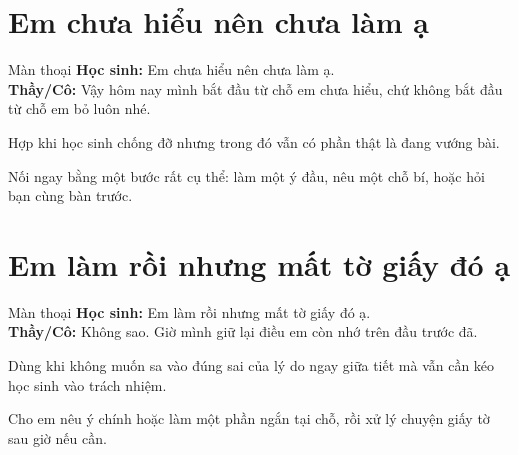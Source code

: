 \section{Em chưa hiểu nên chưa làm ạ}
\begin{manthoai}{Màn thoại}
\textbf{Học sinh:} Em chưa hiểu nên chưa làm ạ.\\
\textbf{Thầy/Cô:} Vậy hôm nay mình bắt đầu từ chỗ em chưa hiểu, chứ không bắt đầu từ chỗ em bỏ luôn nhé.
\end{manthoai}
\begin{dungkhinào}
Hợp khi học sinh chống đỡ nhưng trong đó vẫn có phần thật là đang vướng bài.
\end{dungkhinào}
\begin{nhipthem}
Nối ngay bằng một bước rất cụ thể: làm một ý đầu, nêu một chỗ bí, hoặc hỏi bạn cùng bàn trước.
\end{nhipthem}
\ngancach

\section{Em làm rồi nhưng mất tờ giấy đó ạ}
\begin{manthoai}{Màn thoại}
\textbf{Học sinh:} Em làm rồi nhưng mất tờ giấy đó ạ.\\
\textbf{Thầy/Cô:} Không sao. Giờ mình giữ lại điều em còn nhớ trên đầu trước đã.
\end{manthoai}
\begin{dungkhinào}
Dùng khi không muốn sa vào đúng sai của lý do ngay giữa tiết mà vẫn cần kéo học sinh vào trách nhiệm.
\end{dungkhinào}
\begin{nhipthem}
Cho em nêu ý chính hoặc làm một phần ngắn tại chỗ, rồi xử lý chuyện giấy tờ sau giờ nếu cần.
\end{nhipthem}
